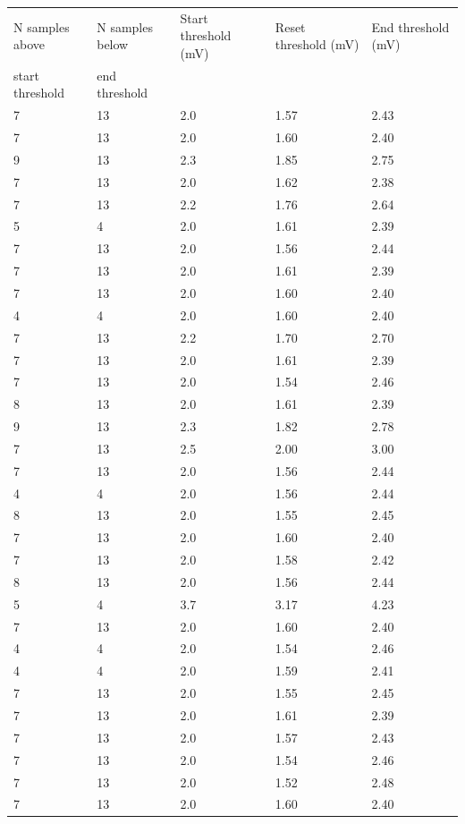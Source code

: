 \documentclass[12pt]{article}
\begin{document}
\begin{table}[ht!]
    \scriptsize
    \centering
    \begin{tabular}{lllll}
	N samples above & N samples below& Start threshold (mV) & Reset threshold (mV) & End threshold (mV)\\
	start threshold & end threshold &  &  & \\
	\hline
	7 & 13 & 2.0 & 1.57 & 2.43\\
	7 & 13 & 2.0 & 1.60 & 2.40\\
	9 & 13 & 2.3 & 1.85 & 2.75\\
	7 & 13 & 2.0 & 1.62 & 2.38\\
	7 & 13 & 2.2 & 1.76 & 2.64\\
	5 & 4 & 2.0 & 1.61 & 2.39\\
	7 & 13 & 2.0 & 1.56 & 2.44\\
	7 & 13 & 2.0 & 1.61 & 2.39\\
	7 & 13 & 2.0 & 1.60 & 2.40\\
	4 & 4 & 2.0 & 1.60 & 2.40\\
	7 & 13 & 2.2 & 1.70 & 2.70\\
	7 & 13 & 2.0 & 1.61 & 2.39\\
	7 & 13 & 2.0 & 1.54 & 2.46\\
	8 & 13 & 2.0 & 1.61 & 2.39\\
	9 & 13 & 2.3 & 1.82 & 2.78\\
	7 & 13 & 2.5 & 2.00 & 3.00\\
	7 & 13 & 2.0 & 1.56 & 2.44\\
	4 & 4 & 2.0 & 1.56 & 2.44\\
	8 & 13 & 2.0 & 1.55 & 2.45\\
	7 & 13 & 2.0 & 1.60 & 2.40\\
	7 & 13 & 2.0 & 1.58 & 2.42\\
	8 & 13 & 2.0 & 1.56 & 2.44\\
	5 & 4 & 3.7 & 3.17 & 4.23\\
	7 & 13 & 2.0 & 1.60 & 2.40\\
	4 & 4 & 2.0 & 1.54 & 2.46\\
	4 & 4 & 2.0 & 1.59 & 2.41\\
	7 & 13 & 2.0 & 1.55 & 2.45\\
	7 & 13 & 2.0 & 1.61 & 2.39\\
	7 & 13 & 2.0 & 1.57 & 2.43\\
	7 & 13 & 2.0 & 1.54 & 2.46\\
	7 & 13 & 2.0 & 1.52 & 2.48\\
	7 & 13 & 2.0 & 1.60 & 2.40\\
    \end{tabular}
\end{table}
\end{document}
